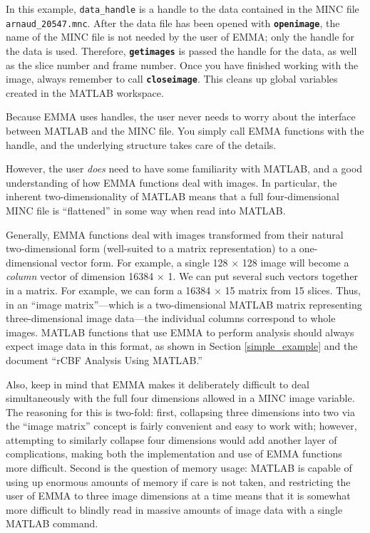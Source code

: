\documentclass[11pt]{article}
\def\code#1{{\tt \bf #1}}
\begin{document}
In this example, \verb+data_handle+ is a handle to the data contained
in the MINC file \verb+arnaud_20547.mnc+.  After the data file has
been opened with \code{openimage}, the name of the MINC file is not
needed by the user of EMMA; only the handle for the data is used.
Therefore, \code{getimages} is passed the handle for the data, as well
as the slice number and frame number.  Once you have finished working
with the image, always remember to call \code{closeimage}.  This
cleans up global variables created in the MATLAB workspace.

Because EMMA uses handles, the user never needs to worry about the
interface between MATLAB and the MINC file.  You simply call EMMA
functions with the handle, and the underlying structure takes care of
the details.

However, the user {\em does} need to have some familiarity with
MATLAB, and a good understanding of how EMMA functions deal with
images.  In particular, the inherent two-dimensionality of MATLAB
means that a full four-dimensional MINC file is ``flattened'' in some
way when read into MATLAB.

Generally, EMMA functions deal with images transformed from their
natural two-dimensional form (well-suited to a matrix representation)
to a one-dimensional vector form.  For example, a single 128 $\times$
128 image will become a {\em column} vector of dimension 16384
$\times$ 1.  We can put several such vectors together in a matrix.
For example, we can form a 16384 $\times$ 15 matrix from 15 slices.
Thus, in an ``image matrix''---which is a two-dimensional MATLAB
matrix representing three-dimensional image data---the individual
columns correspond to whole images.  MATLAB functions that use EMMA to
perform analysis should always expect image data in this format, as
shown in Section
\ref{simple_example} and the document ``rCBF Analysis Using MATLAB.''

Also, keep in mind that EMMA makes it deliberately difficult to deal
simultaneously with the full four dimensions allowed in a MINC image
variable.  The reasoning for this is two-fold: first, collapsing three
dimensions into two via the ``image matrix'' concept is fairly
convenient and easy to work with; however, attempting to similarly
collapse four dimensions would add another layer of complications,
making both the implementation and use of EMMA functions more
difficult.  Second is the question of memory usage: MATLAB is capable
of using up enormous amounts of memory if care is not taken, and
restricting the user of EMMA to three image dimensions at a time means
that it is somewhat more difficult to blindly read in massive amounts
of image data with a single MATLAB command.
\end{document}
